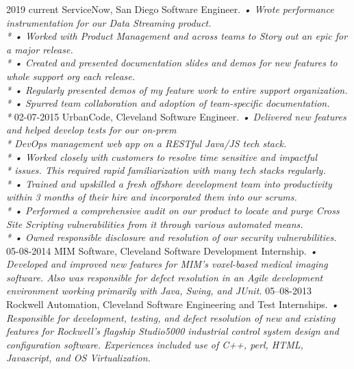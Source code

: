 \documentclass[]{friggeri-cv}
\begin{document}
\begin{entrylist}
  \entry
    {2019 current}
    {ServiceNow, San Diego}
    {Software Engineer.}
    {\emph{
    •	Wrote performance instrumentation for our Data Streaming product.\\*
    •	Worked with Product Management and across teams to Story out an epic for a major release.\\*
    •	Created and presented documentation slides and demos for new features to whole support org each release.\\*
    •	Regularly presented demos of my feature work to entire support organization. \\*
    •	Spurred team collaboration and adoption of team-specific documentation. \\*
    }}
  \entry
    {02-07-2015}
    {UrbanCode, Cleveland}
    {Software Engineer.}
    {\emph{
    •	Delivered new features and helped develop tests for our on-prem \\* DevOps management web app on a RESTful Java/JS tech stack.\\*
    •	Worked closely with customers to resolve time sensitive and impactful\\* issues. This required rapid familiarization with many tech stacks regularly.\\*
    •	Trained and upskilled a fresh offshore development team into productivity within 3 months of their hire and incorporated them into our scrums. \\*
    •	Performed a comprehensive audit on our product to locate and purge Cross Site Scripting vulnerabilities from it through various automated means.\\*
    •	Owned responsible disclosure and resolution of our security vulnerabilities.}}
  \entry
    {05-08-2014}
    {MIM Software, Cleveland}
    {Software Development Internship.}
    {\emph{
    •	Developed and improved new features for MIM's voxel-based medical imaging software. Also was responsible for defect resolution in an Agile development environment working primarily with Java, Swing, and JUnit.}}
  \entry
    {05–08-2013}
    {Rockwell Automation, Cleveland}
    {Software Engineering and Test Internships.}
    {\emph{
    •	Responsible for development, testing, and defect resolution of new and existing features for Rockwell’s flagship Studio5000 industrial control system design and configuration software.  Experiences included use of C++, perl, HTML, Javascript, and OS Virtualization.}}
\end{entrylist}
\end{document}
